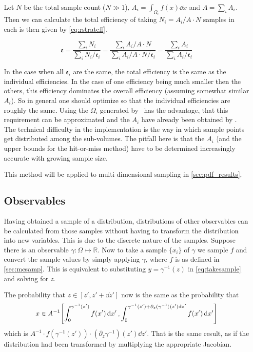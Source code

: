 Let \(N\) be the total sample count (\(N\gg 1\)),
\(A_i = \int_{\Omega_i}f(x)\dd{x}\) and \(A=\sum_iA_i\).
Then we can calculate the total efficiency of taking \(N_i=A_i/A \cdot N\)
samples in each is then given by \cref{eq:rstrateff}.

\begin{equation}
  \label{eq:rstrateff}
  \mathfrak{e} = \frac{\sum_i N_i}{\sum_i N_i/\mathfrak{e}_i} =
  \frac{\sum_i A_i/A\cdot N}{\sum_i A_i/A\cdot N/ \mathfrak{e}_i} = \frac{\sum_i A_i}{\sum_i A_i/\mathfrak{e}_i}
\end{equation}

In the case when all \(\mathfrak{e}_i\) are the same, the total
efficiency is the same as the individual efficiencies. In the case of
one efficiency being much smaller then the others, this efficiency
dominates the overall efficiency (assuming somewhat similar
\(A_i\)). So in general one should optimize so that the individual
efficiencies are roughly the same. Using the \(\Omega_i\) generated by
\vegas\ has the advantage, that this requirement can be approximated
and the \(A_i\) have already been obtained by \vegas. The technical
difficulty in the implementation is the way in which sample points get
distributed among the sub-volumes. The pitfall here is that the
\(A_i\) (and the upper bounds for the hit-or-miss method) have to be
determined increasingly accurate with growing sample size.

This method will be applied to multi-dimensional sampling in
\cref{sec:pdf_results}.

\subsection{Observables}%
\label{sec:obs}

Having obtained a sample of a distribution, distributions of other
observables can be calculated from those samples without having to
transform the distribution into new variables. This is due to the
discrete nature of the samples. Suppose there is an observable
\(\gamma\colon\Omega\mapsto\mathbb{R}\). Now to take a sample
\(\{x_i\}\) of \(\gamma\) we sample \(f\) and convert the sample
values by simply applying \(\gamma\), where \(f\) is as defined in
\cref{sec:mcsamp}. This is equivalent to substituting
\(y=\gamma^{-1}(z)\) in \cref{eq:takesample} and solving for \(z\).

The probability that \(z\in[z', z'+\dd{z'}]\) now is the same as the
probability that
\[\displaystyle x\in
  A^{-1}\qty[\int_{0}^{\gamma^{-1}(z')}f(x')\dd{x'},
  \int_{0}^{\gamma^{-1}(z')+\partial_z(\gamma^{-1})(z')\dd{z'}}f(x')\dd{x'}]\]
which is
\(A^{-1}\cdot f(\gamma^{-1}(z'))\cdot
(\partial_z\gamma^{-1})(z')\dd{z'}\). That is the same result, as if
the distribution had been transformed by multiplying the appropriate
Jacobian.

